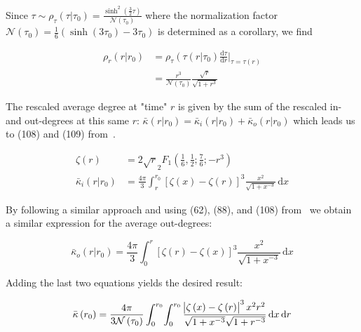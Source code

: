 \documentclass[preprint,notitlepage,amsmath,amssymb,floatfix]{revtex4-1}
\begin{document}
\noindent Since $\tau \sim \rho_\tau\left(\tau|\tau_0\right) = \frac{\sinh^2\left(\frac{3}{2}\tau\right)}{\mathcal{N}\left(\tau_0\right)}$ where the normalization factor $\mathcal{N}\left(\tau_0\right) = \frac{1}{6}\left(\sinh\left(3\tau_0\right) - 3\tau_0\right)$ is determined as a corollary, we find

\begin{equation}
\begin{split}
\rho_r\left(r|r_0\right) &= \rho_\tau\left(\tau\left(r\right|\tau_0\right)\frac{\mathrm d\tau}{\mathrm dr}|_{\tau=\tau\left(r\right)} \\
 &= \frac{r^3}{\mathcal{N}\left(\tau_0\right)}\frac{\sqrt r}{\sqrt{1+r^3}}
\end{split}
\end{equation}

\noindent The rescaled average degree at "time" $r$ is given by the sum of the rescaled in- and out-degrees at this same $r$:  $\bar\kappa\left(r|r_0\right) = \bar\kappa_i\left(r|r_0\right) + \bar\kappa_o\left(r|r_0\right)$ which leads us to (108) and (109) from~\cite{ref:snc2012}.

\begin{align}
\zeta\left(r\right) &= 2\sqrt r _2F_1\left(\frac{1}{6},\frac{1}{2};\frac{7}{6}; -r^3\right) \\
\bar\kappa_i\left(r|r_0\right) &= \frac{4\pi}{3}\int_r^{r_0}\!\left[\zeta\left(x\right)-\zeta\left(r\right)\right]^3\frac{x^2}{\sqrt{1+x^{-3}}}\,\mathrm dx
\end{align}

\noindent By following a similar approach and using (62), (88), and (108) from~\cite{ref:snc2012} we obtain a similar expression for the average out-degrees:

\begin{equation}
\bar\kappa_o\left(r|r_0\right) = \frac{4\pi}{3}\int_0^r\!\left[\zeta\left(r\right) - \zeta\left(x\right)\right]^3\frac{x^2}{\sqrt{1+x^{-3}}}\,\mathrm dx
\end{equation}

\noindent Adding the last two equations yields the desired result:

\begin{equation}
\label{eq:kappa}
\bar\kappa\left(r_0\right) = \frac{4\pi}{3\mathcal{N}\left(\tau_0\right)}\int_0^{r_0} \! \int_0^{r_0} \frac{\abs{\zeta\left(x\right) - \zeta\left(r\right)}^3 x^2 r^2}{\sqrt{1+x^{-3}}\sqrt{1+r^{-3}}}\,\mathrm dx\,\mathrm dr
\end{equation}
\end{document}
